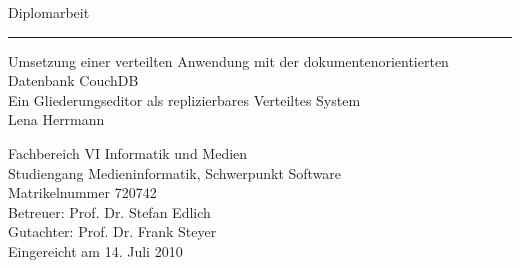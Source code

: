 %
%
%
%


\begin{titlepage}
\begin{spacing}{1}

\begin{flushright}
  \Large{\textsf{Diplomarbeit}}
\end{flushright}
\vspace{1em}


\hrule height 1.5pt depth 0.0pt 
\vspace{0.2em}

\begin{flushleft}
  
  \Huge{\textsf{Umsetzung einer verteilten Anwendung mit der dokumentenorientierten Datenbank CouchDB\\}}
  \vspace{0.4em}
  \Large{\textsf{Ein Gliederungseditor als replizierbares Verteiltes System\\}}
  \vspace{1.7em}
  \Large{\textsf{Lena Herrmann}}

  \vspace{8.3em}

  \begin{figure}[!ht]
    \quad\quad
  \end{figure}


  \vspace{1.5em}

  \normalsize{\textsf{Fachbereich VI Informatik und Medien\\
    Studiengang Medieninformatik, Schwerpunkt Software\\
    Matrikelnummer 720742\\
    \vspace{0.9em}
    Betreuer: Prof. Dr. Stefan Edlich\\
		Gutachter: Prof. Dr. Frank Steyer\\
		\vspace{0.9em}
		Eingereicht am 14. Juli 2010
  }}
\end{flushleft}


\end{spacing}
\end{titlepage}